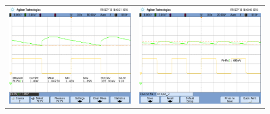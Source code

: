 \begin{figure}[H]
    \centering
    \begin{tabular}{c c}
        \includegraphics[scale=0.2]{../Mediciones/Osciloscopio/Barrido_Frecuencia/scope_1.png} & 
        \includegraphics[scale=0.2]{../Mediciones/Osciloscopio/Barrido_Frecuencia/scope_2.png} \\

\end{tabular}
\end{figure}
